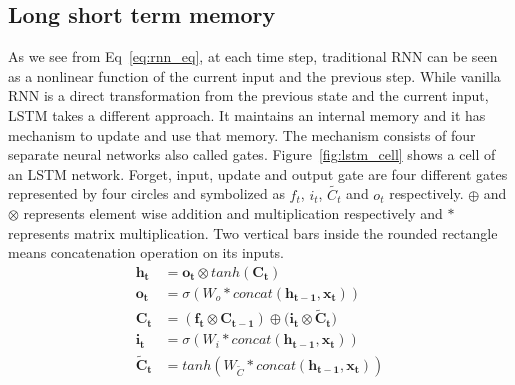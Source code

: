 \documentclass[10pt,twocolumn,letterpaper]{article}
\begin{document}
\subsection{Long short term memory} \label{lstm_sec}
As we see from Eq~\ref{eq:rnn_eq}, at each time step, traditional RNN can be seen as a nonlinear function of the current input and the previous step. While vanilla RNN is a direct transformation from the previous state and the current input, LSTM takes a different approach. It maintains an internal memory and it has mechanism to update and use that memory. The mechanism consists of four separate neural networks also called gates. Figure~\ref{fig:lstm_cell} shows a cell of an LSTM network.
Forget, input, update and output gate are four different gates represented by four circles and symbolized as $f_t$, $i_t$, $\tilde{C_t}$ and $o_t$ respectively. $\oplus$ and $\otimes$ represents element wise addition and multiplication respectively and $*$ represents matrix multiplication. Two vertical bars inside the rounded rectangle means concatenation operation on its inputs. 
\begin{equation}
\label{eq:lstm_eq}
	\begin{aligned}
		\mathbf{h_t} &= \mathbf{o_t} \otimes tanh(\mathbf{C_t}) \\
		\mathbf{o_t} &= \sigma(W_o * concat(\mathbf{h_{t-1}}, \mathbf{x_t})) \\
		\mathbf{C_t} &= (\mathbf{f_t} \otimes \mathbf{C_{t-1}}) \oplus (\mathbf{i_t} \otimes \mathbf{\tilde{C}_t)}  \\
		\mathbf{i_t} &= \sigma(W_i * concat(\mathbf{h_{t-1}}, \mathbf{x_t})) \\
		\mathbf{\tilde{C}_t} &= tanh(W_{\tilde{C}} * concat(\mathbf{h_{t-1}}, \mathbf{x_t}))
	\end{aligned}
\end{equation}
\end{document}
